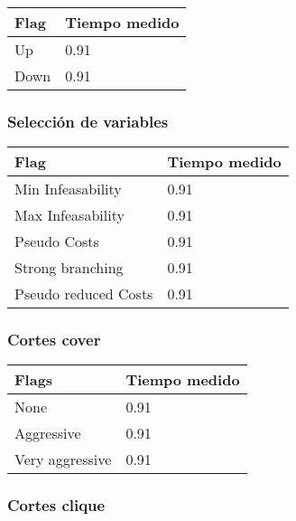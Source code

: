     \begin{center}
        \begin{tabular}{ | m{7em} | m{5cm} | }
        \hline
        Flag & Tiempo medido \\
        \hline
        Up & 0.91 \\
        \hline
        Down & 0.91 \\
        \hline
        \end{tabular}
    \end{center}

\subsubsection{Selección de variables}

    \begin{center}
        \begin{tabular}{ | m{11em} | m{5cm} | }
        \hline
        Flag & Tiempo medido \\
        \hline
        Min Infeasability & 0.91 \\
        \hline
        Max Infeasability & 0.91 \\
        \hline
        Pseudo Costs & 0.91 \\
        \hline
        Strong branching & 0.91 \\
        \hline
        Pseudo reduced Costs & 0.91 \\
        \hline
        \end{tabular}
    \end{center}

\subsubsection{Cortes cover}

    \begin{center}
        \begin{tabular}{ | m{7em} | m{5cm} | }
        \hline
        Flags  & Tiempo medido \\
        \hline
        None  & 0.91 \\
        \hline
        Aggressive  & 0.91 \\
        \hline
        Very aggressive  & 0.91 \\
        \hline
        \end{tabular}
    \end{center}

\subsubsection{Cortes clique}

